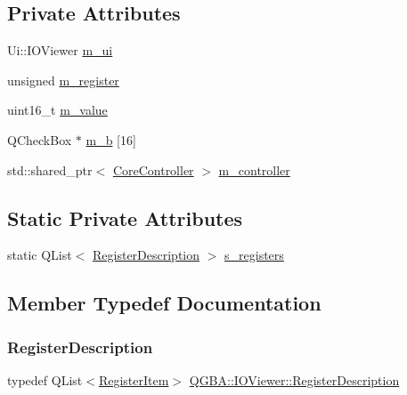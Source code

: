 \subsection*{Private Attributes}
\begin{DoxyCompactItemize}
\item 
Ui\+::\+I\+O\+Viewer \mbox{\hyperlink{class_q_g_b_a_1_1_i_o_viewer_a4b08db92799e06c14d03646ebc6d914f}{m\+\_\+ui}}
\item 
unsigned \mbox{\hyperlink{class_q_g_b_a_1_1_i_o_viewer_abf35456edda2c66462eeeb18ac9e4098}{m\+\_\+register}}
\item 
uint16\+\_\+t \mbox{\hyperlink{class_q_g_b_a_1_1_i_o_viewer_a769893a0f29de245f05f6471533f51f4}{m\+\_\+value}}
\item 
Q\+Check\+Box $\ast$ \mbox{\hyperlink{class_q_g_b_a_1_1_i_o_viewer_a28470df7c6c0ae8234917294d472fbda}{m\+\_\+b}} \mbox{[}16\mbox{]}
\item 
std\+::shared\+\_\+ptr$<$ \mbox{\hyperlink{class_q_g_b_a_1_1_core_controller}{Core\+Controller}} $>$ \mbox{\hyperlink{class_q_g_b_a_1_1_i_o_viewer_a1864a390112d8e33d170ef3e9ecbe525}{m\+\_\+controller}}
\end{DoxyCompactItemize}
\subsection*{Static Private Attributes}
\begin{DoxyCompactItemize}
\item 
static Q\+List$<$ \mbox{\hyperlink{class_q_g_b_a_1_1_i_o_viewer_ac2099e64016757f9d1162bab33cf51bf}{Register\+Description}} $>$ \mbox{\hyperlink{class_q_g_b_a_1_1_i_o_viewer_a3cf43368b34bf9465d7a4b1fb9e2b5b5}{s\+\_\+registers}}
\end{DoxyCompactItemize}


\subsection{Member Typedef Documentation}
\mbox{\label{class_q_g_b_a_1_1_i_o_viewer_ac2099e64016757f9d1162bab33cf51bf}} 
\subsubsection{\texorpdfstring{Register\+Description}{RegisterDescription}}
{\footnotesize\ttfamily typedef Q\+List$<$\mbox{\hyperlink{struct_q_g_b_a_1_1_i_o_viewer_1_1_register_item}{Register\+Item}}$>$ \mbox{\hyperlink{class_q_g_b_a_1_1_i_o_viewer_ac2099e64016757f9d1162bab33cf51bf}{Q\+G\+B\+A\+::\+I\+O\+Viewer\+::\+Register\+Description}}}



